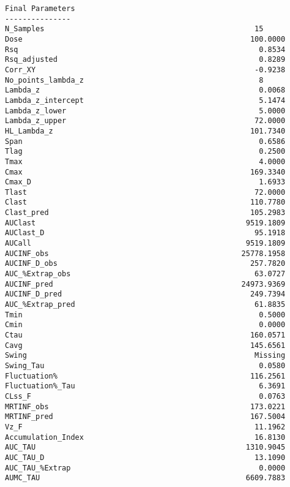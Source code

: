 \documentclass[12pt,a4paper]{article}
\begin{document}
\begin{verbatim}
Final Parameters
---------------
N_Samples                                                15
Dose                                                    100.0000
Rsq                                                       0.8534
Rsq_adjusted                                              0.8289
Corr_XY                                                  -0.9238
No_points_lambda_z                                        8
Lambda_z                                                  0.0068
Lambda_z_intercept                                        5.1474
Lambda_z_lower                                            5.0000
Lambda_z_upper                                           72.0000
HL_Lambda_z                                             101.7340
Span                                                      0.6586
Tlag                                                      0.2500
Tmax                                                      4.0000
Cmax                                                    169.3340
Cmax_D                                                    1.6933
Tlast                                                    72.0000
Clast                                                   110.7780
Clast_pred                                              105.2983
AUClast                                                9519.1809
AUClast_D                                                95.1918
AUCall                                                 9519.1809
AUCINF_obs                                            25778.1958
AUCINF_D_obs                                            257.7820
AUC_%Extrap_obs                                          63.0727
AUCINF_pred                                           24973.9369
AUCINF_D_pred                                           249.7394
AUC_%Extrap_pred                                         61.8835
Tmin                                                      0.5000
Cmin                                                      0.0000
Ctau                                                    160.0571
Cavg                                                    145.6561
Swing                                                    Missing
Swing_Tau                                                 0.0580
Fluctuation%                                            116.2561
Fluctuation%_Tau                                          6.3691
CLss_F                                                    0.0763
MRTINF_obs                                              173.0221
MRTINF_pred                                             167.5004
Vz_F                                                     11.1962
Accumulation_Index                                       16.8130
AUC_TAU                                                1310.9045
AUC_TAU_D                                                13.1090
AUC_TAU_%Extrap                                           0.0000
AUMC_TAU                                               6609.7883




\end{verbatim}
\end{document}
